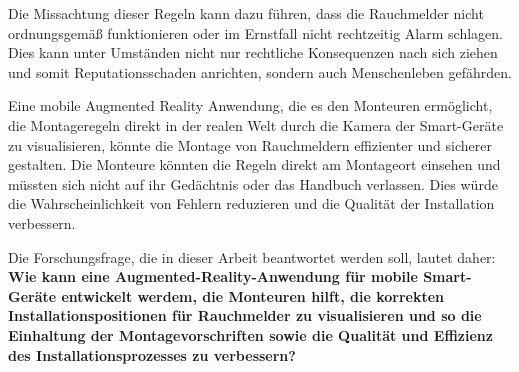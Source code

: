 Die Missachtung dieser Regeln kann dazu führen, dass die Rauchmelder nicht ordnungsgemäß funktionieren oder im Ernstfall nicht rechtzeitig Alarm schlagen. Dies kann unter Umständen nicht nur rechtliche Konsequenzen nach sich ziehen und somit Reputationsschaden anrichten, sondern auch Menschenleben gefährden.

Eine mobile Augmented Reality Anwendung, die es den Monteuren ermöglicht, die Montageregeln direkt in der realen Welt durch die Kamera der Smart-Geräte zu visualisieren, könnte die Montage von Rauchmeldern effizienter und sicherer gestalten. Die Monteure könnten die Regeln direkt am Montageort einsehen und müssten sich nicht auf ihr Gedächtnis oder das Handbuch verlassen. Dies würde die Wahrscheinlichkeit von Fehlern reduzieren und die Qualität der Installation verbessern.

Die Forschungsfrage, die in dieser Arbeit beantwortet werden soll, lautet daher: \textbf{Wie kann eine Augmented-Reality-Anwendung für mobile Smart-Geräte entwickelt werdem, die Monteuren hilft, die korrekten Installationspositionen für Rauchmelder zu visualisieren und so die Einhaltung der Montagevorschriften sowie die Qualität und Effizienz des Installationsprozesses zu verbessern?}

